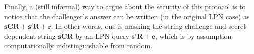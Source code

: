 \documentclass[11pt,a4paper]{article}
\theoremstyle{definition}
\begin{document}
Finally, a (still informal) way to argue about the security of this protocol is to notice that the challenger's answer can be written (in the original LPN case) as $\bm{s}\bm{CR} + \bm{s}'\bm{R} + \bm{r}$.
In other words, one is masking the string challenge-and-secret-dependent string $\bm{sCR}$ by an LPN query $\bm{s}'\bm{R} + \bm{e}$, which is by assumption computationally indistinguishable from random. 









\end{document}
